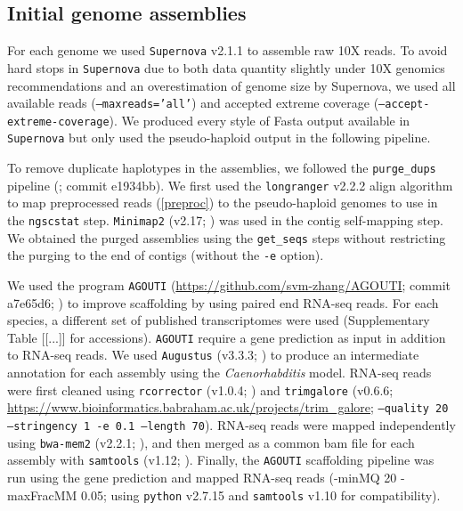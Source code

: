 \documentclass[11pt, a4paper]{article}
\begin{document}
\subsection{Initial genome assemblies}\label{draft_asm}

For each genome we used \texttt{Supernova} v2.1.1 \parencite{Weisenfeld2017} to assemble raw 10X reads.
To avoid hard stops in \texttt{Supernova} due to both data quantity slightly under 10X genomics recommendations and an overestimation of genome size by Supernova, we used all available reads (\texttt{--maxreads='all'}) and accepted extreme coverage (\texttt{--accept-extreme-coverage}).
We produced every style of Fasta output available in \texttt{Supernova} but only used the pseudo-haploid output in the following pipeline.

To remove duplicate haplotypes in the assemblies, we followed the \texttt{purge\_dups} pipeline (\cite{Guan2020}; commit e1934bb).
We first used the \texttt{longranger} v2.2.2 align algorithm to map preprocessed reads (\cref{preproc}) to the pseudo-haploid genomes to use in the \texttt{ngscstat} step.
\texttt{Minimap2} (v2.17; \cite{Li2017}) was used in the contig self-mapping step.
We obtained the purged assemblies using the \texttt{get\_seqs} steps without restricting the purging to the end of contigs (without the \texttt{-e} option).

We used the program \texttt{AGOUTI} (\url{https://github.com/svm-zhang/AGOUTI}; commit a7e65d6; \cite{Zhang2016a}) to improve scaffolding by using paired end RNA-seq reads.
For each species, a different set of published transcriptomes were used (Supplementary Table [[...]] for accessions).
\texttt{AGOUTI} require a gene prediction as input in addition to RNA-seq reads.
We used \texttt{Augustus} (v3.3.3; \cite{Stanke2008}) to produce an intermediate annotation for each assembly using the \textit{Caenorhabditis} model.
RNA-seq reads were first cleaned using \texttt{rcorrector} (v1.0.4; \cite{Song2015}) and \texttt{trimgalore} (v0.6.6; \url{https://www.bioinformatics.babraham.ac.uk/projects/trim_galore}; \texttt{--quality 20 --stringency 1 -e 0.1 --length 70}).
RNA-seq reads were mapped independently using \texttt{bwa-mem2} (v2.2.1; \cite{VasimuddinMd2019}), and then merged as a common bam file for each assembly with \texttt{samtools} (v1.12; \cite{Li2009}).
Finally, the \texttt{AGOUTI} scaffolding pipeline was run using the gene prediction and mapped RNA-seq reads (-minMQ 20 -maxFracMM 0.05; using \texttt{python} v2.7.15 and \texttt{samtools} v1.10 for compatibility).
\end{document}
